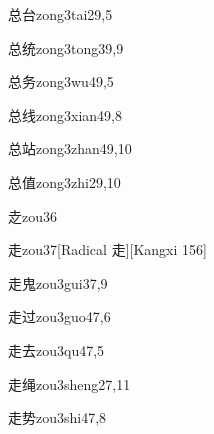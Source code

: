 \begin{entry}{总台}{zong3tai2}{9,5}
\end{entry}

\begin{entry}{总统}{zong3tong3}{9,9}
\end{entry}

\begin{entry}{总务}{zong3wu4}{9,5}
\end{entry}

\begin{entry}{总线}{zong3xian4}{9,8}
\end{entry}

\begin{entry}{总站}{zong3zhan4}{9,10}
\end{entry}

\begin{entry}{总值}{zong3zhi2}{9,10}
\end{entry}

\begin{entry}{赱}{zou3}{6}
\end{entry}

\begin{entry}{走}{zou3}{7}[Radical 走][Kangxi 156]
\end{entry}

\begin{entry}{走鬼}{zou3gui3}{7,9}
\end{entry}

\begin{entry}{走过}{zou3guo4}{7,6}
\end{entry}

\begin{entry}{走去}{zou3qu4}{7,5}
\end{entry}

\begin{entry}{走绳}{zou3sheng2}{7,11}
\end{entry}

\begin{entry}{走势}{zou3shi4}{7,8}
\end{entry}

